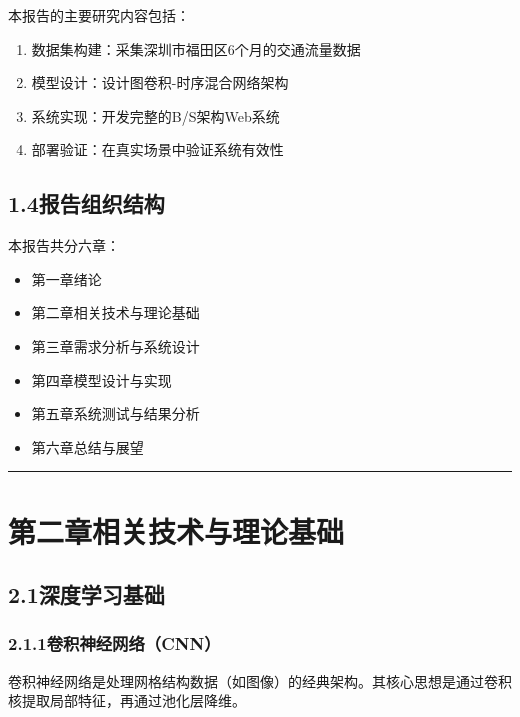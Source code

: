 \documentclass{harryopo-report}
\begin{document}
本报告的主要研究内容包括：

\begin{enumerate}
  \item {\fzht 数据集构建}：采集深圳市福田区6个月的交通流量数据
  \item {\fzht 模型设计}：设计图卷积-时序混合网络架构
  \item {\fzht 系统实现}：开发完整的B/S架构Web系统
  \item {\fzht 部署验证}：在真实场景中验证系统有效性
\end{enumerate}

\section*{1.4报告组织结构}

本报告共分六章：

\begin{itemize}
  \item {\fzht 第一章}绪论
  \item {\fzht 第二章}相关技术与理论基础
  \item {\fzht 第三章}需求分析与系统设计
  \item {\fzht 第四章}模型设计与实现
  \item {\fzht 第五章}系统测试与结果分析
  \item {\fzht 第六章}总结与展望
\end{itemize}

\medskip\hrule\medskip

\chapter*{第二章相关技术与理论基础}

\section*{2.1深度学习基础}

\subsection*{2.1.1卷积神经网络（CNN）}

卷积神经网络是处理网格结构数据（如图像）的经典架构。其核心思想是通过卷积核提取局部特征，再通过池化层降维。
\end{document}
